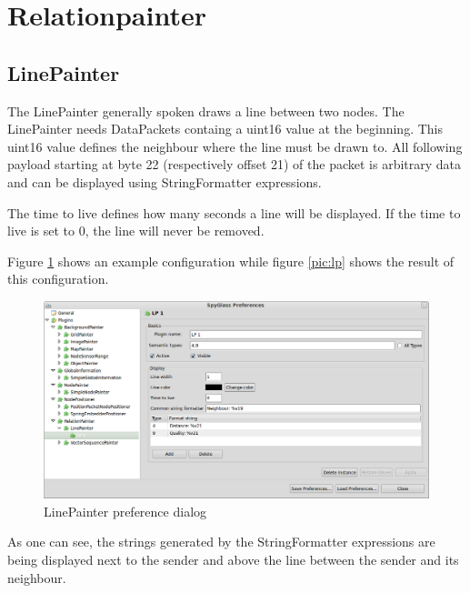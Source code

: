 \section{Relationpainter}

\subsection{LinePainter}

The LinePainter generally spoken draws a line between two nodes. The LinePainter needs DataPackets containg a uint16 value
at the beginning. This uint16 value defines the neighbour where the line must be drawn to. All following payload starting
at byte 22 (respectively offset 21) of the packet is arbitrary data and can be displayed using
StringFormatter expressions.

The time to live defines how many seconds a line will be displayed. If the time to live is set to 0, the line will
never be removed.

Figure \ref{pic:lp_preferences} shows an example configuration while figure \ref{pic:lp} shows the result of this
configuration.

\begin{figure}[htb]
  \begin{center}
    \includegraphics[width=13.2cm]{./pics/linepainter_prefpage}
    \caption{LinePainter preference dialog}
    \label{pic:lp_preferences}
  \end{center}
\end{figure}

As one can see, the strings generated by the StringFormatter expressions are being displayed next to the
sender and above the line between the sender and its neighbour.

